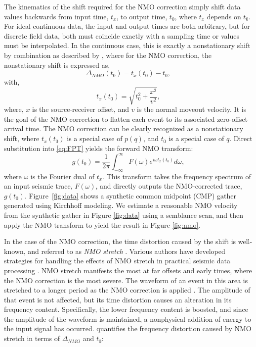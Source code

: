 The kinematics of the shift required for the NMO correction simply shift data values backwards from input time, $t_{x}$, to output time, $t_{0}$, where $t_{x}$ depends on $t_{0}$.  For ideal continuous data, the input and output times are both arbitrary, but for discrete field data, both must coincide exactly with a sampling time or values must be interpolated.  
In the continuous case, this is exactly a nonstationary shift by combination as described by \cite{margrave98}, where for the NMO correction, the nonstationary shift is expressed as,
\begin{equation}
\label{eq:DeltaNMO}
	\Delta_{NMO} \left( t_0 \right) = t_x \left( t_0 \right) - t_0,
\end{equation}
\cite{burnett_ferguson08a} with,
\begin{equation}
\label{eq:NMO}
	t_x(t_0)=\sqrt{t_0^2+\frac{x^2}{v^2}},
\end{equation}
where, $x$ is the source-receiver offset, and $v$ is the normal moveout velocity.  
It is the goal of the NMO correction to flatten each event to its associated zero-offset arrival time. The NMO correction can be clearly recognized as a nonstationary shift, where $t_x(t_0)$ is a special case of $p(q)$, and $t_0$ is a special case of $q$.  Direct substitution into \ref{eq:FPT} yields the forward NMO transform:
\begin{equation}
  g\left(t_0\right) =\frac{1}{2\pi }\int _{-\infty }^{\infty }F(\omega )e^{i \omega t_x(t_0)} d\omega ,
\label{eq:NMOT}
\end{equation}
where $\omega $ is the Fourier dual of $t_x$.  This transform takes the frequency spectrum of an input seismic trace, $F(\omega )$, and directly outputs the NMO-corrected trace, $g(t_0)$.  
Figure~\ref{fig:data} shows a synthetic common midpoint (CMP) gather generated using Kirchhoff modeling.
We estimate a reasonable NMO velocity from the synthetic gather in Figure \ref{fig:data} using a semblance scan, and then apply the NMO transform to yield the result in Figure \ref{fig:nmo}.

In the case of the NMO correction, the time distortion caused by the shift is well-known, and referred to as \textit{NMO stretch} \cite{buchholtz72,dunkin_levin73}. 
Various authors have developed strategies for handling the effects of NMO stretch in practical seismic data processing \cite{miller92,perroud_tygel04,shatilo_aminzadeh00}. 
NMO stretch manifests the most at far offsets and early times, where the NMO correction is the most severe.  
The waveform of an event in this area is stretched to a longer period as the NMO correction is applied \cite[]{yilmaz01}.  
The amplitude of that event is not affected, but its time distortion causes an alteration in its frequency content.  
Specifically, the lower frequency content is boosted, and since the amplitude of the waveform is maintained, a nonphysical addition of energy to the input signal has occurred.   
\cite{yilmaz01} quantifies the frequency distortion caused by NMO stretch in terms of $\Delta _{NMO}$ and $t_0$:

